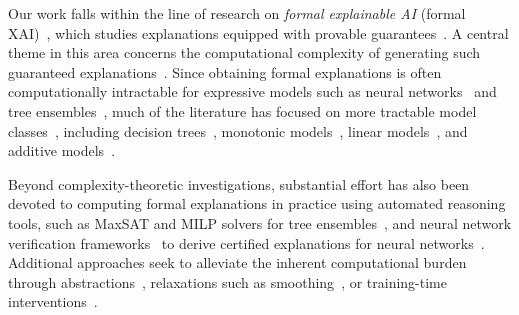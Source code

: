 \documentclass{article}
\begin{document}
Our work falls within the line of research on \emph{formal explainable AI} (formal XAI)~\citep{marques2022delivering}, which studies explanations equipped with provable guarantees~\citep{yu2023eliminating, darwiche2022computation, darwiche2023logic, shih2018symbolic, azzolinbeyond, audemard2021computational, calautti2025complexity}. A central theme in this area concerns the computational complexity of generating such guaranteed explanations~\citep{BaMoPeSu20, bassan2026unifying, marzoukbassanshap, marzouk2025on, marzouk2024tractability, bassan2025additive, amir2024hard, blanc2021provably, blanc2022query, jaakkola2025explainability, amgoud2026axiomatic, geibinger2025and}. Since obtaining formal explanations is often computationally intractable for expressive models such as neural networks~\citep{adolfi2024complexity, BaMoPeSu20} and tree ensembles~\citep{ordyniak2024explaining, bassanmakes}, much of the literature has focused on more tractable model classes~\citep{marques2023no}, including decision trees~\citep{bouniausing, arenas2022computing, bounia2024enhancing, bounia2023approximating}, monotonic models~\citep{marques2021explanations, harzli2022cardinality}, linear models~\citep{marques2020explaining, subercaseaux2024probabilistic}, and additive models~\citep{bassan2026provably}.

Beyond complexity-theoretic investigations, substantial effort has also been devoted to computing formal explanations in practice using automated reasoning tools, such as MaxSAT and MILP solvers for tree ensembles~\citep{audemard2023computing, audemard2022preferred, ignatiev2022using, boumazouza2021asteryx}, and neural network verification frameworks~\citep{wang2021beta, wu2024marabou} to derive certified explanations for neural networks~\citep{wu2024verix, bassan2023towards, bassan2023formally, izza2024distance, hadad2026, ignatiev2019abduction}. Additional approaches seek to alleviate the inherent computational burden through abstractions~\citep{de2025faster, bassan2025explaining, boumazouza2026fame}, relaxations such as smoothing~\citep{xue2023stability, anani2025pixel, jin2025probabilistic}, or training-time interventions~\citep{alvarez2018towards, bassan2025explain, bassan2025self}.
\end{document}
